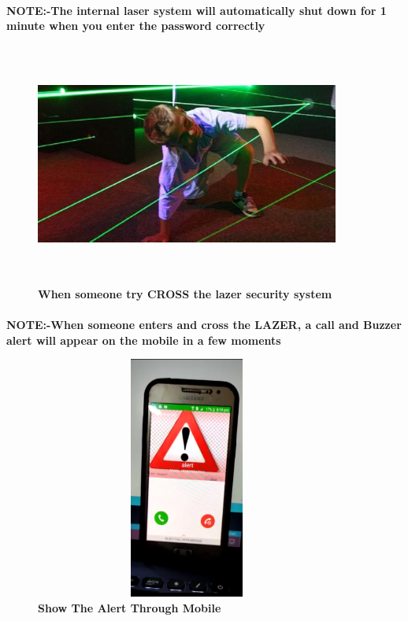 \paragraph{}\textbf{\color{red} NOTE:-The internal laser system will automatically shut down for 1 minute when you enter the password correctly}
\vspace{1cm}

\begin{figure}[H]
  \centering
    \includegraphics[height= 8cm, width=10cm]{project/images/cross}
    \caption{\textbf {When someone try CROSS the lazer security system}}
\end{figure}
\paragraph{}\textbf{\color{red}NOTE:-When someone enters and cross the LAZER, a call and Buzzer alert  will appear on the mobile in a few moments}


\begin{figure}[H]
  \centering
    \includegraphics[height= 8cm, width=10cm]{project/images/Screenshot (321)}
    \caption{\textbf {Show The Alert Through Mobile}}
\end{figure}
